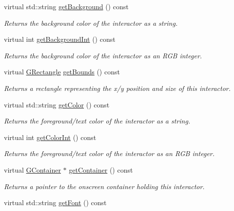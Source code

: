 \begin{DoxyCompactItemize}
virtual std\+::string \mbox{\hyperlink{classGInteractor_a808e22cc1fdfbecf71ed8c64ef4600e0}{get\+Background}} () const
\begin{DoxyCompactList}\small\item\em Returns the background color of the interactor as a string. \end{DoxyCompactList}\item 
virtual int \mbox{\hyperlink{classGInteractor_a9e827257a55cb8cf4d9de2ec6bcfd7a0}{get\+Background\+Int}} () const
\begin{DoxyCompactList}\small\item\em Returns the background color of the interactor as an R\+GB integer. \end{DoxyCompactList}\item 
virtual \mbox{\hyperlink{structGRectangle}{G\+Rectangle}} \mbox{\hyperlink{classGInteractor_a29e6ac35a0b48f491a4c88194cc5da3b}{get\+Bounds}} () const
\begin{DoxyCompactList}\small\item\em Returns a rectangle representing the x/y position and size of this interactor. \end{DoxyCompactList}\item 
virtual std\+::string \mbox{\hyperlink{classGInteractor_aa061dfa488c31e18549d64363c1d0e34}{get\+Color}} () const
\begin{DoxyCompactList}\small\item\em Returns the foreground/text color of the interactor as a string. \end{DoxyCompactList}\item 
virtual int \mbox{\hyperlink{classGInteractor_a9635c7af766cdc3417f346683fa0e6c1}{get\+Color\+Int}} () const
\begin{DoxyCompactList}\small\item\em Returns the foreground/text color of the interactor as an R\+GB integer. \end{DoxyCompactList}\item 
virtual \mbox{\hyperlink{classGContainer}{G\+Container}} $\ast$ \mbox{\hyperlink{classGInteractor_a7a6e317c29d61030929b4cd2d1c00fe7}{get\+Container}} () const
\begin{DoxyCompactList}\small\item\em Returns a pointer to the onscreen container holding this interactor. \end{DoxyCompactList}\item 
virtual std\+::string \mbox{\hyperlink{classGInteractor_a894a5502900794eeb27d084c21f1d77d}{get\+Font}} () const

\end{DoxyCompactItemize}
